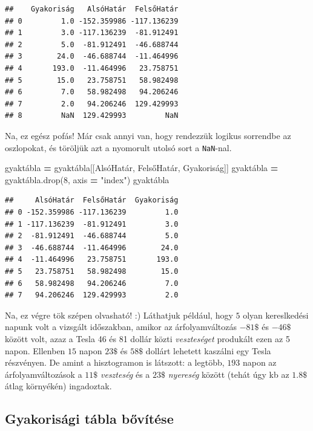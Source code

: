 \documentclass[
]{book}
\newenvironment{Shaded}{\begin{snugshade}}{\end{snugshade}}
\newcommand{\DecValTok}[1]{\textcolor[rgb]{0.00,0.00,0.81}{#1}}
\newcommand{\NormalTok}[1]{#1}
\newcommand{\OperatorTok}[1]{\textcolor[rgb]{0.81,0.36,0.00}{\textbf{#1}}}
\newcommand{\StringTok}[1]{\textcolor[rgb]{0.31,0.60,0.02}{#1}}
\begin{document}
\begin{verbatim}
##    Gyakoriság   AlsóHatár  FelsőHatár
## 0         1.0 -152.359986 -117.136239
## 1         3.0 -117.136239  -81.912491
## 2         5.0  -81.912491  -46.688744
## 3        24.0  -46.688744  -11.464996
## 4       193.0  -11.464996   23.758751
## 5        15.0   23.758751   58.982498
## 6         7.0   58.982498   94.206246
## 7         2.0   94.206246  129.429993
## 8         NaN  129.429993         NaN
\end{verbatim}

Na, ez egész pofás! Már csak annyi van, hogy rendezzük logikus sorrendbe az oszlopokat, és töröljük azt a nyomorult utolsó sort a \texttt{NaN}-nal.

\begin{Shaded}
\begin{Highlighting}[]
\NormalTok{gyaktábla }\OperatorTok{=}\NormalTok{ gyaktábla[[}\StringTok{\textquotesingle{}AlsóHatár\textquotesingle{}}\NormalTok{, }\StringTok{\textquotesingle{}FelsőHatár\textquotesingle{}}\NormalTok{, }\StringTok{\textquotesingle{}Gyakoriság\textquotesingle{}}\NormalTok{]]}
\NormalTok{gyaktábla }\OperatorTok{=}\NormalTok{ gyaktábla.drop(}\DecValTok{8}\NormalTok{, axis }\OperatorTok{=} \StringTok{"index"}\NormalTok{)}
\NormalTok{gyaktábla}
\end{Highlighting}
\end{Shaded}

\begin{verbatim}
##     AlsóHatár  FelsőHatár  Gyakoriság
## 0 -152.359986 -117.136239         1.0
## 1 -117.136239  -81.912491         3.0
## 2  -81.912491  -46.688744         5.0
## 3  -46.688744  -11.464996        24.0
## 4  -11.464996   23.758751       193.0
## 5   23.758751   58.982498        15.0
## 6   58.982498   94.206246         7.0
## 7   94.206246  129.429993         2.0
\end{verbatim}

Na, ez végre tök szépen olvasható! :) Láthatjuk például, hogy \(5\) olyan kereslkedési napunk volt a vizsgált időszakban, amikor az árfolyamváltozás \(-81\$\) és \(-46\$\) között volt, azaz a Tesla 46 és 81 dollár közti \emph{veszteséget} produkált ezen az 5 napon. Ellenben \(15\) napon \(23\$\) és \(58\$\) dollárt lehetett kaszálni egy Tesla részvényen. De amint a hisztogramon is látszott: a legtöbb, \(193\) napon az árfolyamváltozások a \(11\$\) \emph{veszteség} és a \(23\$\) \emph{nyereség} között (tehát úgy kb az \(1.8\$\) átlag környékén) ingadoztak.

\subsection{Gyakorisági tábla bővítése}\label{gyakorisuxe1gi-tuxe1bla-bux151vuxedtuxe9se}
\end{document}
